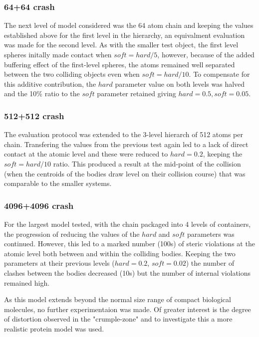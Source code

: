\subsubsection{64+64 crash}

The next level of model considered was the 64 atom chain and keeping the values established
above for the first level in the hierarchy, an equivalment evaluation was made for the second level.
As with the smaller test object, the first level spheres initally made contact when $soft = hard/5$,
however, because of the added buffering effect of the first-level spheres, the atoms remained
well separated between the two colliding objects even when $soft = hard/10$.  To compensate for
this additive contribution, the $hard$ parameter value on both levels was halved and the 10\%
ratio to the $soft$ parameter retained giving $hard = 0.5, soft = 0.05$. 

\subsubsection{512+512 crash}

The evaluation protocol was extended to the 3-level hierarch of 512 atoms per chain.
Transfering the values from the previous test again led to a lack of direct contact at the
atomic level and these were reduced to $hard = 0.2$, keeping the $soft = hard/10$ ratio.
This produced a result at the mid-point of the collision (when the centroids of the bodies
draw level on their collision course) that was comparable to the smaller systems.

\subsubsection{4096+4096 crash}

For the largest model tested, with the chain packaged into 4 levels of containers,  the
progression of reducing the values of the $hard$ and $soft$ parameters was continued.
However, this led to a marked number (100s) of steric violations at the atomic level both
between and within the colliding bodies.   Keeping the two parameters at their previous
levels ($hard = 0.2$, $soft = 0.02$) the number of clashes between the bodies decreased
(10s) but the number of internal violations remained high.

As this model extends beyond the normal size range of compact biological molecules,
no further experimentaion was made.   Of greater interest is the degree of distortion 
observed in the "crumple-zone" and to investigate this a more realistic protein model
was used.


